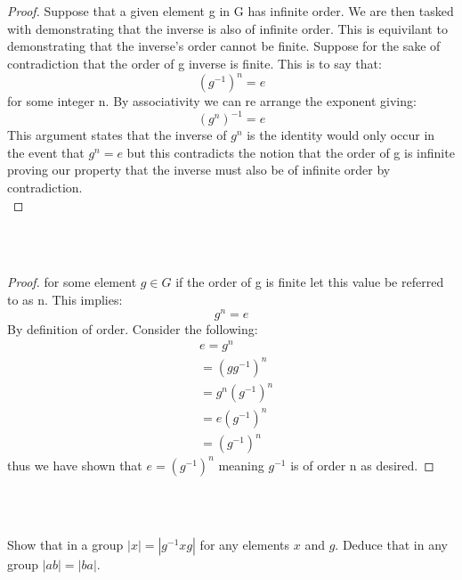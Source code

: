 \documentclass[11pt]{article}
\theoremstyle{definition}  %
\newcommand{\bigline}{\\\noindent\makebox[\linewidth]{\rule{\paperwidth}{0.4pt}}\\}
\begin{document}
    \\\\
    \begin{proof}
    Suppose that a given element g in G has infinite order. We are then tasked with demonstrating that the inverse is also of infinite order. This is equivilant to demonstrating that the inverse's order cannot be finite. Suppose for the sake of contradiction that the order of g inverse is finite. This is to say that:
    \[
      (g^{-1})^n=e
    \]
    for some integer n. By associativity we can re arrange the exponent giving:
    \[
      (g^n)^{-1}=e
    \]
    This argument states that the inverse of $g^n$ is the identity would only occur in the event that $g^n=e$ but this contradicts the notion that the order of g is infinite proving our property that the inverse must also be of infinite order by contradiction.
    \\
  \end{proof}
    \\\\
    \begin{proof}
    for some element $g\in G$ if the order of g is finite let this value be referred to as n. This implies:
    \[
      g^n =e
    \]
    By definition of order. Consider the following:
    \begin{align*}
        &e=g^n\\
        &=(gg^{-1})^n\\
        &=g^n(g^{-1})^n\\
        &=e(g^{-1})^n\\
        &=(g^{-1})^n
    \end{align*}
    thus we have shown that $e=(g^{-1})^n$ meaning $g^{-1}$ is of order n as desired.
\end{proof}
\bigline
\begin{tcolorbox}[title=Question 7]
\item Show that in a group $|x| = |g^{-1}xg|$ for any elements $x$ and $g$. Deduce that in any group $|ab| = |ba|$.
\end{tcolorbox}
\end{document}
